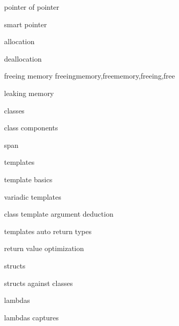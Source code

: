          pointer of pointer
        
         smart pointer
        
         allocation 
        
         deallocation 
        
         freeing memory 
        freeingmemory,freememory,freeing,free 
        
         leaking memory 
        
         classes 
        
         class components 
        
         span 
        
         templates
        
         template basics 
        
         variadic templates
        
         class template argument deduction 
        
         templates auto return types 
        
         return value optimization 
        
         structs 
        
         structs against classes 
        
         lambdas
        
         lambdas captures
        
